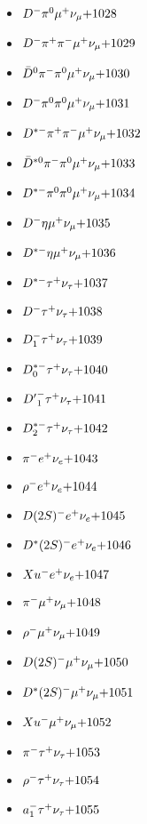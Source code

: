 \begin{multicols}{3}
\begin{itemize}
 \item $ D^{-} \pi^{0} \mu^{+} \nu_{\mu} \hfill{+1028}$
 \item $ D^{-} \pi^{+} \pi^{-} \mu^{+} \nu_{\mu} \hfill{+1029}$
 \item $ \bar{D}^{0} \pi^{-} \pi^{0} \mu^{+} \nu_{\mu} \hfill{+1030}$
 \item $ D^{-} \pi^{0} \pi^{0} \mu^{+} \nu_{\mu} \hfill{+1031}$
 \item $ D^{*-} \pi^{+} \pi^{-} \mu^{+} \nu_{\mu} \hfill{+1032}$
 \item $ \bar{D}^{*0} \pi^{-} \pi^{0} \mu^{+} \nu_{\mu} \hfill{+1033}$
 \item $ D^{*-} \pi^{0} \pi^{0} \mu^{+} \nu_{\mu} \hfill{+1034}$
 \item $ D^{-} \eta \mu^{+} \nu_{\mu} \hfill{+1035}$
 \item $ D^{*-} \eta \mu^{+} \nu_{\mu} \hfill{+1036}$
 \item $ D^{*-} \tau^{+} \nu_{\tau} \hfill{+1037}$
 \item $ D^{-} \tau^{+} \nu_{\tau} \hfill{+1038}$
 \item $ D_{1}^{-} \tau^{+} \nu_{\tau} \hfill{+1039}$
 \item $ D_{0}^{*-} \tau^{+} \nu_{\tau} \hfill{+1040}$
 \item $ {D^{\prime}}_{1}^{-} \tau^{+} \nu_{\tau} \hfill{+1041}$
 \item $ D_{2}^{*-} \tau^{+} \nu_{\tau} \hfill{+1042}$
 \item $ \pi^{-} e^{+} \nu_{e} \hfill{+1043}$
 \item $ \rho^{-} e^{+} \nu_{e} \hfill{+1044}$
 \item $ D(2S)^{-} e^{+} \nu_{e} \hfill{+1045}$
 \item $ D^{*}(2S)^{-} e^{+} \nu_{e} \hfill{+1046}$
 \item $ Xu^{-} e^{+} \nu_{e} \hfill{+1047}$
 \item $ \pi^{-} \mu^{+} \nu_{\mu} \hfill{+1048}$
 \item $ \rho^{-} \mu^{+} \nu_{\mu} \hfill{+1049}$
 \item $ D(2S)^{-} \mu^{+} \nu_{\mu} \hfill{+1050}$
 \item $ D^{*}(2S)^{-} \mu^{+} \nu_{\mu} \hfill{+1051}$
 \item $ Xu^{-} \mu^{+} \nu_{\mu} \hfill{+1052}$
 \item $ \pi^{-} \tau^{+} \nu_{\tau} \hfill{+1053}$
 \item $ \rho^{-} \tau^{+} \nu_{\tau} \hfill{+1054}$
 \item $ a_{1}^{-} \tau^{+} \nu_{\tau} \hfill{+1055}$

\end{itemize}
\end{multicols}
